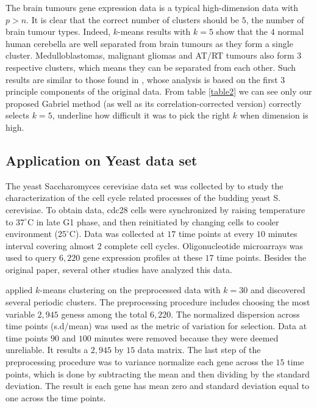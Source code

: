 \documentclass[12pt]{article}
\begin{document}
The brain tumours gene expression data is a typical high-dimension data with $p > n$. It is clear that 
the correct number of clusters should be $5$, the number of brain tumour types. Indeed, $k$-means results with $k=5$ show that the $4$ normal human cerebella are well separated from brain tumours as they form a single cluster.  
Medulloblastomas, malignant gliomas and AT/RT tumours also form $3$ respective clusters, which means they can be separated from each other. Such results are similar to those found in \cite{pomeroy2002prediction}, whose analysis
is based on the first $3$ principle components of the original data.    
From table \ref{table2} we can see only our proposed Gabriel method (as well as its correlation-corrected version) correctly selects $k=5$, underline how difficult it was to pick the right $k$ when dimension is high. 


\subsection{Application on Yeast data set}
The yeast Saccharomyces cerevisiae data set was collected by \cite{cho1998genome} to study the characterization of the cell cycle related processes of the budding yeast S. cerevisiae. To obtain data, cdc28 cells were synchronized by raising temperature to $37^\circ$C in late G1 phase, and then reinitiated by changing cells to cooler environment ($25^\circ$C). Data was collected at $17$ time points at every $10$ minutes interval covering almost $2$ complete cell cycles. Oligonucleotide microarrays was used to query $6,220$ gene expression profiles at these $17$ time points. Besides the original paper, several other studies have analyzed this data.

\cite{tavazoie1999systematic} applied $k$-means clustering on the preprocessed data with $k=30$ and discovered several periodic clusters. The preprocessing procedure includes choosing the most variable $2,945$ geness among the total $6,220$. The normalized dispersion across time points (s.d/mean) was used as the metric of variation for selection. Data at time points $90$ and $100$ minutes were removed because they were deemed unreliable. It results a $2,945$ by $15$ data matrix. The last step of the preprocessing procedure was to variance normalize each gene across the $15$ time points, which is done by subtracting the mean and then dividing by the standard deviation. The result is each gene has mean zero and standard deviation equal to one across the time points.
\end{document}
